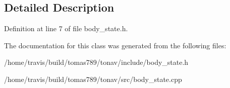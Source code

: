 \subsection{Detailed Description}


Definition at line 7 of file body\-\_\-state.\-h.



The documentation for this class was generated from the following files\-:\begin{DoxyCompactItemize}
\item 
/home/travis/build/tomas789/tonav/include/body\-\_\-state.\-h\item 
/home/travis/build/tomas789/tonav/src/body\-\_\-state.\-cpp\end{DoxyCompactItemize}
